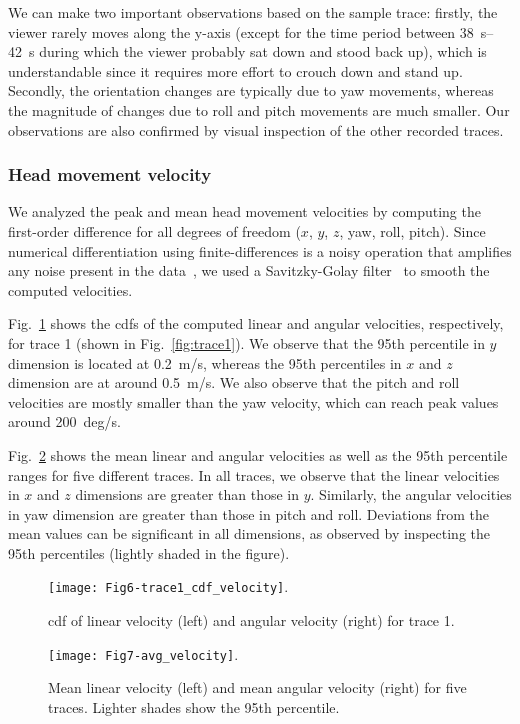 \documentclass[sigconf]{acmart}			%
\begin{document}
We can make two important observations based on the sample trace: firstly, the viewer rarely moves along the y-axis (except for the time period between \SIrange{38}{42}{s} during which the viewer probably sat down and stood back up), which is understandable since it requires more effort to crouch down and stand up.
Secondly, the orientation changes are typically due to yaw movements, whereas the magnitude of changes due to roll and pitch movements are much smaller.
Our observations are also confirmed by visual inspection of the other recorded traces.

\subsubsection*{Head movement velocity}
We analyzed the peak and mean head movement velocities by computing the first-order difference for all degrees of freedom ($x$, $y$, $z$, yaw, roll, pitch).
Since numerical differentiation using finite-differences is a noisy operation that amplifies any noise present in the data~\cite{chartrand2011}, we used a Savitzky-Golay filter~\cite{savitzky1964} to smooth the computed velocities.

Fig.~\ref{fig:trace1_cdf} shows the \glspl{cdf} of the computed linear and angular velocities, respectively, for trace 1 (shown in Fig.~\ref{fig:trace1}).
We observe that the 95th percentile in $y$ dimension is located at \SI{0.2}{m/s}, whereas the 95th percentiles in $x$ and $z$ dimension are at around \SI{0.5}{m/s}.
We also observe that the pitch and roll velocities are mostly smaller than the yaw velocity, which can reach peak values around \SI{200}{deg/s}.

Fig.~\ref{fig:trace_velocity} shows the mean linear and angular velocities as well as the 95th percentile ranges for five different traces.
In all traces, we observe that the linear velocities in $x$ and $z$ dimensions are greater than those in $y$. Similarly, the angular velocities in yaw dimension are greater than those in pitch and roll.
Deviations from the mean values can be significant in all dimensions, as observed by inspecting the 95th percentiles (lightly shaded in the figure). 

\begin{figure}[ht]
	\texttt{[image: Fig6-trace1\_cdf\_velocity]}.
	\caption{\gls{cdf} of linear velocity (left) and angular velocity (right) for trace 1.}
	\label{fig:trace1_cdf}
\end{figure}

\begin{figure}[ht]
	\texttt{[image: Fig7-avg\_velocity]}.
	\caption{Mean linear velocity (left) and mean angular velocity (right) for five traces. Lighter shades show the 95th percentile.}
	\label{fig:trace_velocity}
\end{figure}
\end{document}
